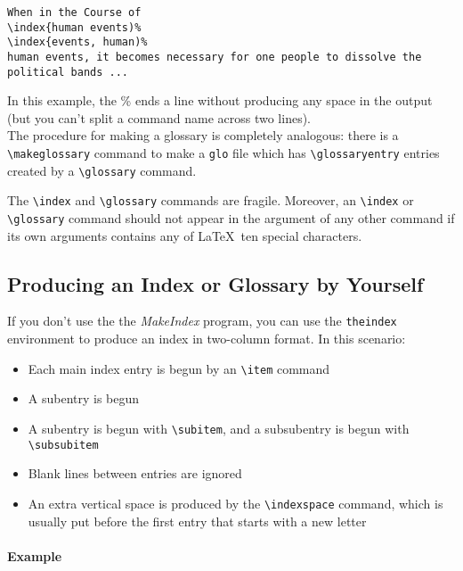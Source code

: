 \documentclass{article}
\newcommand{\justtext}[1]{\texttt{\textbackslash #1}}
\begin{document}
\begin{verbatim}
When in the Course of
\index{human events)%
\index{events, human)%
human events, it becomes necessary for one people to dissolve the political bands ...
\end{verbatim}

In this example, the \% ends a line without producing any space in the output (but you can't split a
command name across two lines).\\


The procedure for making a glossary is completely analogous: 
there is a \justtext{makeglossary} command to make a {\tt glo} file which has 
\justtext{glossaryentry} entries created by a \justtext{glossary} command.

The \justtext{index} and \justtext{glossary} commands are fragile. Moreover,
an \justtext{index} or \justtext{glossary} command should not appear in the argument of any other
command if its own arguments contains any of \LaTeX\ ten special characters.

\subsection{Producing an Index or Glossary by Yourself}\label{manual-production-index}

If you don't use the the \emph{MakeIndex} program, you can use the {\tt theindex} environment to
produce an index in two-column format. In this scenario:

\begin{itemize}
   \item Each main index entry is begun by an \justtext{item} command
   \item A subentry is begun 
   \item A subentry is begun with \justtext{subitem}, and a subsubentry is begun with 
         \justtext{subsubitem}
   \item Blank lines between entries are ignored
   \item An extra vertical space is produced by the \justtext{indexspace} command, which is usually
    put before the first entry that starts with a new letter
\end{itemize}

\paragraph{Example}
\end{document}
